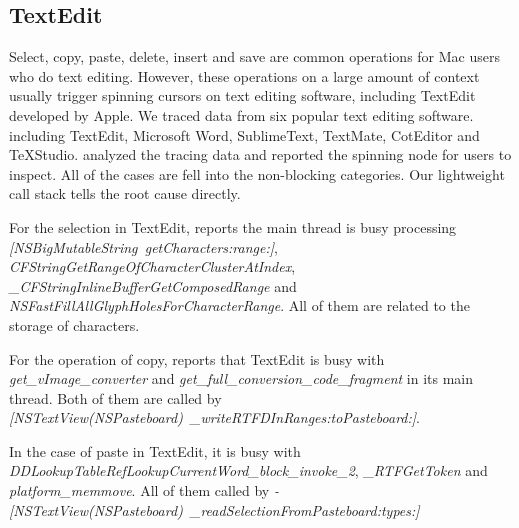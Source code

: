 \subsection{TextEdit}

Select, copy, paste, delete, insert and save are common operations for Mac
users who do text editing. However, these operations on a large amount of
context usually trigger spinning cursors on text editing software, including
TextEdit developed by Apple. We traced data from six popular text editing
software. including TextEdit, Microsoft Word, SublimeText, TextMate, CotEditor
and TeXStudio. \xxx analyzed the tracing data and reported the spinning node for
users to inspect. All of the cases are fell into the non-blocking categories.
Our lightweight call stack tells the root cause directly.

For the selection in TextEdit, \xxx reports the main thread is busy
processing \textit{[NSBigMutableString\ getCharacters:range:]},
\textit{CFStringGetRangeOfCharacterClusterAtIndex},
\textit{\_CFStringInlineBufferGetComposedRange} and
\textit{NSFastFillAllGlyphHolesForCharacterRange}. All of them are related to
the storage of characters.

For the operation of copy, \xxx reports that TextEdit
is busy with \textit{get\_vImage\_converter} and
\textit{get\_full\_conversion\_code\_fragment} in its main thread.
Both of them are called by \textit{[NSTextView(NSPasteboard)\
\_writeRTFDInRanges:toPasteboard:]}.

In the case of paste in TextEdit, it is busy with
\textit{DDLookupTableRefLookupCurrentWord\_block\_invoke\_2},
\textit{\_RTFGetToken} and \textit{platform\_memmove}. All of them called by
\textit{-[NSTextView(NSPasteboard)\ \_readSelectionFromPasteboard:types:]}

